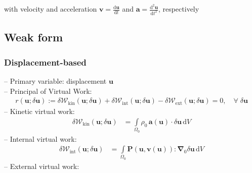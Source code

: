 \documentclass[a4paper,12pt]{report}
\newcommand{\bs}[1]{\boldsymbol{#1}}
\newcommand{\Om}{\mathit{\Omega}}
\begin{document}
with velocity and acceleration $\bs{v}=\frac{\mathrm{d}\bs{u}}{\mathrm{d}t}$ and $\bs{a}=\frac{\mathrm{d}^2\bs{u}}{\mathrm{d}t^2}$, respectively

\subsection{Weak form}

\subsubsection{Displacement-based}
-- Primary variable: displacement $\bs{u}$\\

-- Principal of Virtual Work:
\begin{align}
r(\bs{u};\delta\bs{u}) := \delta \mathcal{W}_{\mathrm{kin}}(\bs{u};\delta\bs{u}) + \delta \mathcal{W}_{\mathrm{int}}(\bs{u};\delta\bs{u}) - \delta \mathcal{W}_{\mathrm{ext}}(\bs{u};\delta\bs{u}) = 0, \quad \forall \; \delta\bs{u}\label{eq:res_u_solid}
\end{align}
-- Kinetic virtual work:
\begin{align}
\delta \mathcal{W}_{\mathrm{kin}}(\bs{u};\delta\bs{u}) &= \int\limits_{\Om_{0}} \rho_{0}\,\bs{a}(\bs{u}) \cdot \delta\bs{u} \,\mathrm{d}V \label{eq:deltaWkin}
\end{align}
-- Internal virtual work:
\begin{align}
\delta \mathcal{W}_{\mathrm{int}}(\bs{u};\delta\bs{u}) &= \int\limits_{\Om_{0}} \bs{P}(\bs{u},\bs{v}(\bs{u})) : \bs{\nabla}_{0} \delta\bs{u} \,\mathrm{d}V \label{eq:deltaWint}
\end{align}
-- External virtual work:\\
\end{document}
